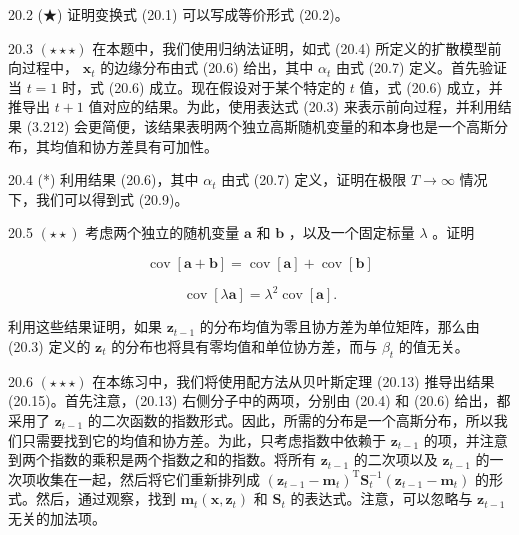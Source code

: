 \documentclass[10pt]{article}
\begin{document}
20.2 (★) 证明变换式 (20.1) 可以写成等价形式 (20.2)。

20.3 \(\left( {\star  \star   \star  }\right)\) 在本题中，我们使用归纳法证明，如式 (20.4) 所定义的扩散模型前向过程中， \({\mathbf{x}}_{t}\) 的边缘分布由式 (20.6) 给出，其中 \({\alpha }_{t}\) 由式 (20.7) 定义。首先验证当 \(t = 1\) 时，式 (20.6) 成立。现在假设对于某个特定的 \(t\) 值，式 (20.6) 成立，并推导出 \(t + 1\) 值对应的结果。为此，使用表达式 (20.3) 来表示前向过程，并利用结果 (3.212) 会更简便，该结果表明两个独立高斯随机变量的和本身也是一个高斯分布，其均值和协方差具有可加性。

20.4 (*) 利用结果 (20.6)，其中 \({\alpha }_{t}\) 由式 (20.7) 定义，证明在极限 \(T \rightarrow  \infty\) 情况下，我们可以得到式 (20.9)。

20.5 \(\left( {\star  \star  }\right)\) 考虑两个独立的随机变量 \(\mathbf{a}\) 和 \(\mathbf{b}\) ，以及一个固定标量 \(\lambda\) 。证明

\[
\operatorname{cov}\left\lbrack  {\mathbf{a} + \mathbf{b}}\right\rbrack   = \operatorname{cov}\left\lbrack  \mathbf{a}\right\rbrack   + \operatorname{cov}\left\lbrack  \mathbf{b}\right\rbrack   \tag{20.61}
\]

\[
\operatorname{cov}\left\lbrack  {\lambda \mathbf{a}}\right\rbrack   = {\lambda }^{2}\operatorname{cov}\left\lbrack  \mathbf{a}\right\rbrack  . \tag{20.62}
\]

利用这些结果证明，如果 \({\mathbf{z}}_{t - 1}\) 的分布均值为零且协方差为单位矩阵，那么由 (20.3) 定义的 \({\mathbf{z}}_{t}\) 的分布也将具有零均值和单位协方差，而与 \({\beta }_{t}\) 的值无关。

20.6 \(\left( {\star  \star   \star  }\right)\) 在本练习中，我们将使用配方法从贝叶斯定理 (20.13) 推导出结果 (20.15)。首先注意，(20.13) 右侧分子中的两项，分别由 (20.4) 和 (20.6) 给出，都采用了 \({\mathbf{z}}_{t - 1}\) 的二次函数的指数形式。因此，所需的分布是一个高斯分布，所以我们只需要找到它的均值和协方差。为此，只考虑指数中依赖于 \({\mathbf{z}}_{t - 1}\) 的项，并注意到两个指数的乘积是两个指数之和的指数。将所有 \({\mathbf{z}}_{t - 1}\) 的二次项以及 \({\mathbf{z}}_{t - 1}\) 的一次项收集在一起，然后将它们重新排列成 \({\left( {\mathbf{z}}_{t - 1} - {\mathbf{m}}_{t}\right) }^{\mathrm{T}}{\mathbf{S}}_{t}^{-1}\left( {{\mathbf{z}}_{t - 1} - {\mathbf{m}}_{t}}\right)\) 的形式。然后，通过观察，找到 \({\mathbf{m}}_{t}\left( {\mathbf{x},{\mathbf{z}}_{t}}\right)\) 和 \({\mathbf{S}}_{t}\) 的表达式。注意，可以忽略与 \({\mathbf{z}}_{t - 1}\) 无关的加法项。
\end{document}
